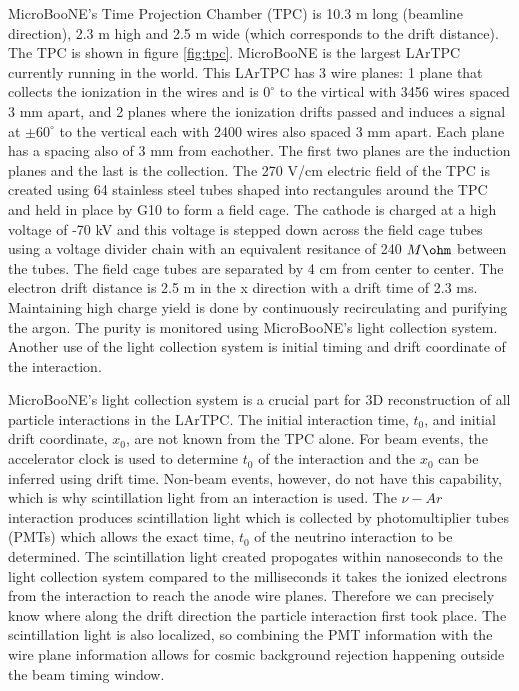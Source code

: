 MicroBooNE's Time Projection Chamber (TPC) is 10.3 m long (beamline direction), 2.3 m high and 2.5 m wide (which corresponds to the drift distance). The TPC is shown in figure \ref{fig:tpc}. MicroBooNE is the largest LArTPC currently running in the world\cite{microboone}. This LArTPC has 3 wire planes: 1 plane that collects the ionization in the wires and is $0^{\circ}$ to the virtical with 3456 wires spaced 3 mm apart, and 2 planes where the ionization drifts passed and induces a signal at $\pm 60^{\circ}$ to the vertical each with 2400 wires also spaced 3 mm apart. Each plane has a spacing also of 3 mm from eachother. The first two planes are the induction planes and the last is the collection. The 270 V/cm electric field of the TPC is created using 64 stainless steel tubes shaped into rectangules around the TPC and held in place by G10 to form a field cage. The cathode is charged at a high voltage of -70 kV and this voltage is stepped down across the field cage tubes using a voltage divider chain with an equivalent resitance of 240 $M\ohm$ between the tubes. The field cage tubes are separated by 4 cm from center to center. The electron drift distance is 2.5 m in the x direction with a drift time of 2.3 ms. Maintaining high charge yield is done by continuously recirculating and purifying the argon. The purity is monitored using MicroBooNE's light collection system. Another use of the light collection system is initial timing and drift coordinate of the interaction. 

MicroBooNE's light collection system is a crucial part for 3D reconstruction of all particle interactions in the LArTPC. The initial interaction time, $t_0$, and initial drift coordinate, $x_0$, are not known from the TPC alone. For beam events, the accelerator clock is used to determine $t_0$ of the interaction and the $x_0$ can be inferred using drift time. Non-beam events, however, do not have this capability, which is why scintillation light from an interaction is used. The $\nu-Ar$ interaction produces scintillation light which is collected by photomultiplier tubes (PMTs) which allows the exact time, $t_0$ of the neutrino interaction to be determined. The scintillation light created propogates within nanoseconds to the light collection system compared to the milliseconds it takes the ionized electrons from the interaction to reach the anode wire planes. Therefore we can precisely know where along the drift direction the particle interaction first took place. The scintillation light is also localized, so combining the PMT information with the wire plane information allows for cosmic background rejection happening outside the beam timing window.  

